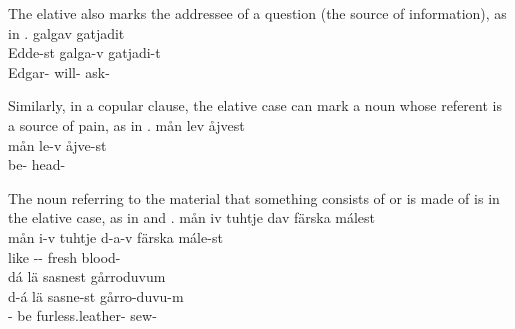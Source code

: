 The elative also marks the addressee of a question (the source of information), as in .
\ea\label{elat5}
 galgav gatjadit\\
	Edde-st galga-v gatjadi-t\\
	Edgar- will- ask-\\\nopagebreak
{} 
\z

Similarly, in a copular clause, the elative case can mark a noun whose referent is a source of pain, as in .
\ea\label{elat6}
\glll	mån lev {åjvest}\\
	mån le-v åjve-st\\
	 be- head-\\\nopagebreak
{} 
\z

The noun referring to the material that something consists of or is made of is in the elative case, as in  and . %
\ea\label{elat3}
\glll	mån iv tuhtje dav färska {málest}\\ %
	mån i-v tuhtje d-a-v färska mále-st\\ 
	  like\BS{} -- fresh blood-\\\nopagebreak
{} %
\z
\ea\label{elat4}
\glll	dá lä {sasnest} gårroduvum\\
	d-á lä sasne-st gårro-duvu-m\\
	-\BS{} be\BS{} furless.leather- sew-\\\nopagebreak
{} 
\z


